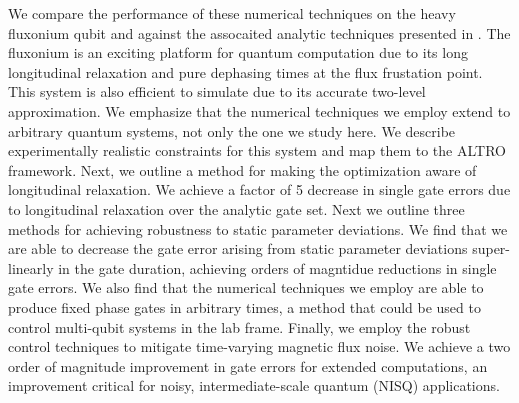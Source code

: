 We compare the performance of these numerical techniques
on the heavy fluxonium qubit and against the assocaited analytic techniques
presented in \cite{zhang2020universal}. The fluxonium is an exciting
platform for quantum computation due to its long longitudinal relaxation
and pure dephasing times at the flux frustation point. This system is also
efficient to simulate due to its accurate two-level approximation.
We emphasize that the numerical techniques we employ extend to arbitrary quantum systems,
not only the one we study here. We describe experimentally realistic constraints for this system
and map them to the ALTRO framework. Next, we
outline a method for making the optimization aware of longitudinal
relaxation. We achieve a factor of 5 decrease in single gate errors due to
longitudinal relaxation over the analytic gate set. Next we outline three methods for achieving
robustness to static parameter deviations. We find that we are able to
decrease the gate error arising from static parameter deviations super-linearly
in the gate duration, achieving orders of magntidue reductions in single gate errors.
We also find that the numerical techniques we employ are able to produce
fixed phase gates in arbitrary times, a method that could be used
to control multi-qubit systems in the lab frame. Finally,
we employ the robust control techniques to mitigate time-varying
magnetic flux noise. We achieve a two order of magnitude improvement
in gate errors for extended computations, an improvement critical
for noisy, intermediate-scale quantum (NISQ) applications.
